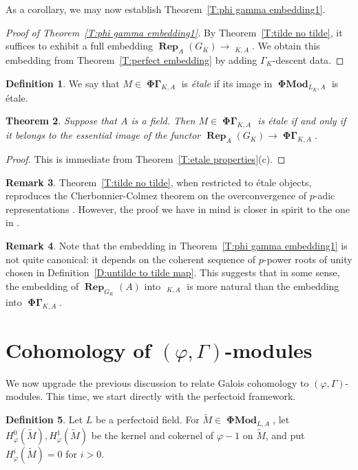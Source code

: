 \documentclass[12pt]{amsart}
\newtheorem{theorem}{Theorem}[section]
\theoremstyle{definition}
\newtheorem{defn}[theorem]{Definition}
\newtheorem{remark}[theorem]{Remark}
\numberwithin{equation}{theorem}
\DeclareMathOperator{\PhiGamma}{\mathbf{\Phi \Gamma}}
\DeclareMathOperator{\PhiGammatilde}{\widetilde{\mathbf{\Phi \Gamma}}}
\DeclareMathOperator{\PhiMod}{\mathbf{\Phi Mod}}
\DeclareMathOperator{\Rep}{\mathbf{Rep}}
\begin{document}
As a corollary, we may now establish Theorem~\ref{T:phi gamma embedding1}.
\begin{proof}[Proof of Theorem~\ref{T:phi gamma embedding1}]
By Theorem~\ref{T:tilde no tilde}, it suffices to exhibit a full embedding
$\Rep_A(G_K) \to \PhiGammatilde_{K,A}$. We obtain this embedding from
Theorem~\ref{T:perfect embedding} by adding $\Gamma_K$-descent data.
\end{proof}

\begin{defn}
We say that $M \in \PhiGamma_{K,A}$ is \emph{\'etale} if its image in $\PhiMod_{L_K,A}$ is \'etale. 
\end{defn}

\begin{theorem}
Suppose that $A$ is a field. Then $M \in \PhiGamma_{K,A}$ is \'etale if and only if it belongs
to the essential image of the functor $\Rep_A(G_K)\to \PhiGamma_{K,A}$.
\end{theorem}
\begin{proof}
This is immediate from Theorem~\ref{T:etale properties}(c).
\end{proof}

\begin{remark}
Theorem~\ref{T:tilde no tilde}, when restricted to \'etale objects, reproduces the Cherbonnier-Colmez theorem on the overconvergence of $p$-adic representations \cite{cherbonnier-colmez}. However, the proof we have in mind is closer in spirit to the one in \cite[\S 2]{kedlaya-new-phigamma}.
\end{remark}

\begin{remark}
Note that the embedding in Theorem~\ref{T:phi gamma embedding1} is not quite canonical: it depends on the coherent sequence of $p$-power roots of unity chosen in Definition~\ref{D:untilde to tilde map}. This suggests that in some sense, the embedding of $\Rep_{G_K}(A)$ into $\PhiGammatilde_{K,A}$  is more natural than the embedding into $\PhiGamma_{K,A}$.
\end{remark}

\section{Cohomology of $(\varphi, \Gamma)$-modules}

We now upgrade the previous discussion to relate Galois cohomology to $(\varphi, \Gamma)$-modules. This time, we start directly with the perfectoid framework.
\begin{defn}
Let $L$ be a perfectoid field.
For $\tilde{M} \in \PhiMod_{L,A}$, let $H^0_{\varphi}(\tilde{M}), H^1_{\varphi}(\tilde{M})$ be the kernel and cokernel of $\varphi-1$ on $\tilde{M}$, and put $H^i_{\varphi}(\tilde{M}) = 0$ for $i>0$.
\end{defn}
\end{document}

